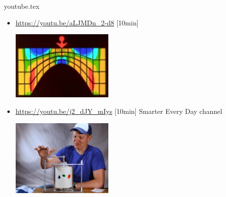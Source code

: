 \begin{flushright} {\tiny {\color{gray} youtube.tex}} \end{flushright}

\begin{itemize}
\item \url{https://youtu.be/aLJMDn_2-d8} [10min]
\begin{center}
\includegraphics[width=5cm]{images/youtube/superold}\\
\end{center}

\item \url{https://youtu.be/j2_dJY_mIys} [10min] Smarter Every Day channel
\begin{center}
\includegraphics[width=5cm]{images/youtube/smarter}\\
\end{center}


\end{itemize}
